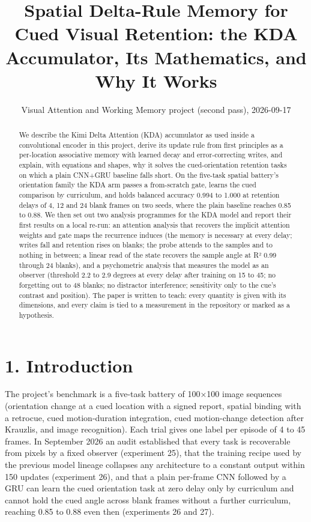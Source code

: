 \documentclass[

]{article}
\title{Spatial Delta-Rule Memory for Cued Visual Retention: the KDA Accumulator, Its Mathematics, and Why It Works}
\author{Visual Attention and Working Memory project (second pass), 2026-09-17}
\date{}
\begin{document}
\maketitle

\begin{abstract}

We describe the Kimi Delta Attention (KDA) accumulator as used inside a convolutional encoder in this project, derive its update rule from first principles as a per-location associative memory with learned decay and error-correcting writes, and explain, with equations and shapes, why it solves the cued-orientation retention tasks on which a plain CNN+GRU baseline falls short. On the five-task spatial battery's orientation family the KDA arm passes a from-scratch gate, learns the cued comparison by curriculum, and holds balanced accuracy 0.994 to 1.000 at retention delays of 4, 12 and 24 blank frames on two seeds, where the plain baseline reaches 0.85 to 0.88. We then set out two analysis programmes for the KDA model and report their first results on a local re-run: an attention analysis that recovers the implicit attention weights and gate maps the recurrence induces (the memory is necessary at every delay; writes fall and retention rises on blanks; the probe attends to the samples and to nothing in between; a linear read of the state recovers the sample angle at R² 0.99 through 24 blanks), and a psychometric analysis that measures the model as an observer (threshold 2.2 to 2.9 degrees at every delay after training on 15 to 45; no forgetting out to 48 blanks; no distractor interference; sensitivity only to the cue's contrast and position). The paper is written to teach: every quantity is given with its dimensions, and every claim is tied to a measurement in the repository or marked as a hypothesis.

\end{abstract}



\section{1. Introduction}\label{introduction}



The project's benchmark is a five-task battery of 100×100 image sequences (orientation change at a cued location with a signed report, spatial binding with a retrocue, cued motion-duration integration, cued motion-change detection after Krauzlis, and image recognition). Each trial gives one label per episode of 4 to 45 frames. In September 2026 an audit established that every task is recoverable from pixels by a fixed observer (experiment 25), that the training recipe used by the previous model lineage collapses any architecture to a constant output within 150 updates (experiment 26), and that a plain per-frame CNN followed by a GRU can learn the cued orientation task at zero delay only by curriculum and cannot hold the cued angle across blank frames without a further curriculum, reaching 0.85 to 0.88 even then (experiments 26 and 27).
\end{document}
